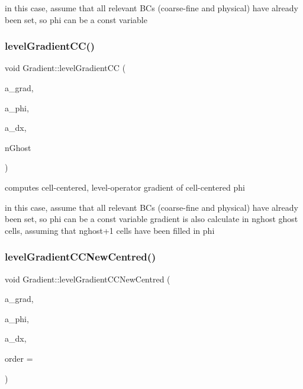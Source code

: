 in this case, assume that all relevant BC\textquotesingle{}s (coarse-\/fine and physical) have already been set, so phi can be a const variable \mbox{\label{class_gradient_a476a6adb3c37375c48b60d91a3c9c949}} 
\subsubsection{\texorpdfstring{level\+Gradient\+C\+C()}{levelGradientCC()}\hspace{0.1cm}{\footnotesize\ttfamily [6/6]}}
{\footnotesize\ttfamily void Gradient\+::level\+Gradient\+CC (\begin{DoxyParamCaption}\item[{\textbf{ Level\+Data}$<$ \textbf{ F\+Array\+Box} $>$ \&}]{a\+\_\+grad,  }\item[{const \textbf{ Level\+Data}$<$ \textbf{ F\+Array\+Box} $>$ \&}]{a\+\_\+phi,  }\item[{const \textbf{ Real}}]{a\+\_\+dx,  }\item[{const int}]{n\+Ghost }\end{DoxyParamCaption})\hspace{0.3cm}{\ttfamily [static]}}



computes cell-\/centered, level-\/operator gradient of cell-\/centered phi 

in this case, assume that all relevant BC\textquotesingle{}s (coarse-\/fine and physical) have already been set, so phi can be a const variable gradient is also calculate in nghost ghost cells, assuming that nghost+1 cells have been filled in phi \mbox{\label{class_gradient_a306b5f347d51c38d5cf8a7f446ea0b86}} 
\subsubsection{\texorpdfstring{level\+Gradient\+C\+C\+New\+Centred()}{levelGradientCCNewCentred()}}
{\footnotesize\ttfamily void Gradient\+::level\+Gradient\+C\+C\+New\+Centred (\begin{DoxyParamCaption}\item[{\textbf{ Level\+Data}$<$ \textbf{ F\+Array\+Box} $>$ \&}]{a\+\_\+grad,  }\item[{const \textbf{ Level\+Data}$<$ \textbf{ F\+Array\+Box} $>$ \&}]{a\+\_\+phi,  }\item[{const \textbf{ Real}}]{a\+\_\+dx,  }\item[{int}]{order = {} }\end{DoxyParamCaption})\hspace{0.3cm}{\ttfamily [static]}}


